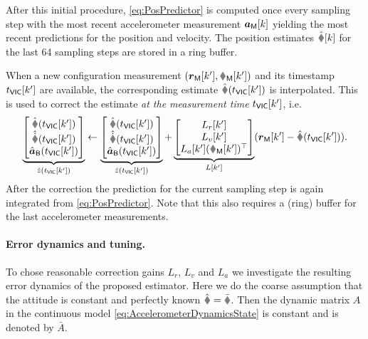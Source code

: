 After this initial procedure, \eqref{eq:PosPredictor} is computed once every sampling step with the most recent accelerometer measurement $\boldsymbol{a}_{\mathsf{M}}[k]$ yielding the most recent predictions for the position and velocity.
The position estimates $\rObs[k]$ for the last 64 sampling steps are stored in a ring buffer.

When a new configuration measurement $(\rVIC[k'], \RVIC[k'])$ and its timestamp $t_{\mathsf{VIC}}[k']$ are available, the corresponding estimate $\rObs(\tVIC[k'])$ is interpolated.
This is used to correct the estimate \textit{at the measurement time} $t_{\mathsf{VIC}}[k']$, i.e.\
\begin{align}\label{eq:PosCorrector}
 \underbrace{\begin{bmatrix} \rObs(\tVIC[k']) \\ \rdObs(\tVIC[k']) \\ \aIMUBObs(\tVIC[k']) \end{bmatrix}}_{\hat{z}(\tVIC[k'])}
 \leftarrow 
 \underbrace{\begin{bmatrix} \rObs(\tVIC[k']) \\ \rdObs(\tVIC[k']) \\ \aIMUBObs(\tVIC[k']) \end{bmatrix}}_{\hat{z}(\tVIC[k'])}
 +
 \underbrace{\begin{bmatrix} L_r[k'] \\ L_v[k'] \\ L_a[k'] (\RVIC[k'])^\top \end{bmatrix}}_{L[k']}
 (\rVIC[k'] - \rObs(\tVIC[k'])).
\end{align}
After the correction the prediction for the current sampling step is again integrated from \eqref{eq:PosPredictor}.
Note that this also requires a (ring) buffer for the last accelerometer measurements.

\paragraph{Error dynamics and tuning.}
To chose reasonable correction gains $L_r$, $L_v$ and $L_a$ we investigate the resulting error dynamics of the proposed estimator.
Here we do the coarse assumption that the attitude is constant and perfectly known $\RObs = \bar{\R}$.
Then the dynamic matrix $A$ in the continuous model \eqref{eq:AccelerometerDynamicsState} is constant and is denoted by $\bar{A}$.

